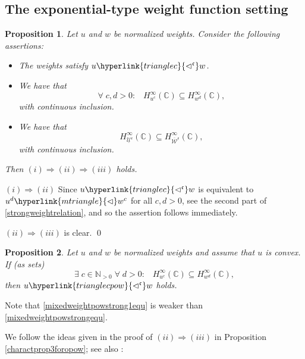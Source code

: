 \documentclass[10pt]{amsart}%
\numberwithin{equation}{section}
\theoremstyle{plain}
\newtheorem{proposition}{Proposition}[section]
\newcommand{\CC}{\mathbb{C}}
\newcommand{\NN}{\mathbb{N}}
\begin{document}
\subsection{The exponential-type weight function setting}

\begin{proposition}\label{mixedweightpowstrong}
	Let $u$ and $w$ be normalized weights. Consider the following assertions:
	\begin{itemize}
		\item[$(i)$] The weights satisfy $u\hyperlink{trianglec}{\vartriangleleft^{\mathfrak{c}}}w$.
		
		\item[$(ii)$] We have that
		\begin{equation}\label{mixedweightpowstrongequ}
			\forall\;c,d>0:\;\;\;H^{\infty}_{u^c}(\CC)\subseteq H^{\infty}_{w^d}(\CC),
		\end{equation}
		with continuous inclusion.
		\item[$(iii)$] We have that
		$$H^{\infty}_{\underline{\mathcal{U}}^{\mathfrak{c}}}(\CC)\subseteq H^{\infty}_{\overline{\mathcal{W}}^{\mathfrak{c}}}(\CC),$$
		with continuous inclusion.
	\end{itemize}
	Then $(i)\Rightarrow(ii)\Rightarrow(iii)$ holds.
\end{proposition}

$(i)\Rightarrow(ii)$ Since $u\hyperlink{trianglec}{\vartriangleleft^{\mathfrak{c}}}w$ is equivalent to $u^d\hyperlink{mtriangle}{\vartriangleleft}w^c$ for all $c,d>0$, see the second part of \eqref{strongweightrelation}, and so the assertion follows immediately.

$(ii)\Rightarrow(iii)$ is clear.
\qed\enddemo

\begin{proposition}\label{mixedweightpowstrong1}
	Let $u$ and $w$ be normalized weights and assume that $u$ is convex. If (as sets)
	\begin{equation}\label{mixedweightpowstrong1equ}
		\exists\;c\in\NN_{>0}\;\forall\;d>0:\;\;\;H^{\infty}_{u^c}(\CC)\subseteq H^{\infty}_{w^d}(\CC),
	\end{equation}
	then $u\hyperlink{trianglecpow}{\vartriangleleft^{\mathfrak{c}}}w$ holds.
\end{proposition}

Note that \eqref{mixedweightpowstrong1equ} is weaker than \eqref{mixedweightpowstrongequ}.

We follow the ideas given in the proof of $(ii)\Rightarrow(iii)$ in Proposition \ref{charactprop3foropow}; see also \cite[Prop. 3.27 $(i)$]{weightedentirecharacterization}:
\end{document}
